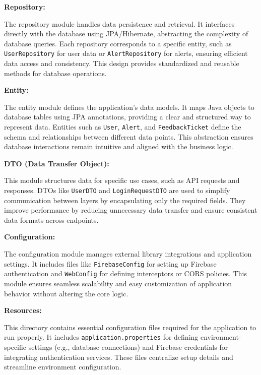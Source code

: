 \documentclass[conference]{IEEEtran}
\begin{document}
\vspace{0.5cm}

\textbf{Repository:}  

The repository module handles data persistence and retrieval. It interfaces directly with the database using JPA/Hibernate, abstracting the complexity of database queries. Each repository corresponds to a specific entity, such as \texttt{UserRepository} for user data or \texttt{AlertRepository} for alerts, ensuring efficient data access and consistency. This design provides standardized and reusable methods for database operations.

\vspace{0.5cm}

\textbf{Entity:}  

The entity module defines the application's data models. It maps Java objects to database tables using JPA annotations, providing a clear and structured way to represent data. Entities such as \texttt{User}, \texttt{Alert}, and \texttt{FeedbackTicket} define the schema and relationships between different data points. This abstraction ensures database interactions remain intuitive and aligned with the business logic.

\vspace{0.5cm}

\textbf{DTO (Data Transfer Object):}  

This module structures data for specific use cases, such as API requests and responses. DTOs like \texttt{UserDTO} and \texttt{LoginRequestDTO} are used to simplify communication between layers by encapsulating only the required fields. They improve performance by reducing unnecessary data transfer and ensure consistent data formats across endpoints.

\vspace{0.5cm}

\textbf{Configuration:}  

The configuration module manages external library integrations and application settings. It includes files like \texttt{FirebaseConfig} for setting up Firebase authentication and \texttt{WebConfig} for defining interceptors or CORS policies. This module ensures seamless scalability and easy customization of application behavior without altering the core logic.

\vspace{0.5cm}

\textbf{Resources:}  

This directory contains essential configuration files required for the application to run properly. It includes \texttt{application.properties} for defining environment-specific settings (e.g., database connections) and Firebase credentials for integrating authentication services. These files centralize setup details and streamline environment configuration.
\end{document}

